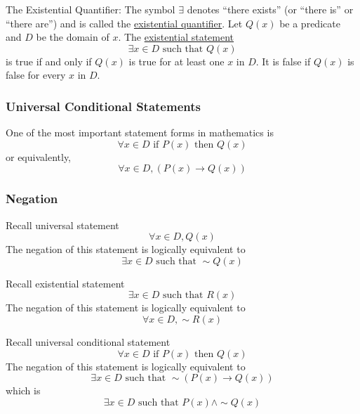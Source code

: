 \begin{definition}
    The Existential Quantifier: The symbol $\exists$ denotes ``there exists'' (or ``there is'' or ``there are'') and is called the \underline{existential quantifier}. Let $Q(x)$ be a predicate and $D$ be the domain of $x$. The \underline{existential statement} $$\exists x\in D \text{ such that } Q(x)$$ is true if and only if $Q(x)$ is true for at least one $x$ in $D$. It is false if $Q(x)$ is false for every $x$ in $D$.
\end{definition}

\subsubsection{Universal Conditional Statements}
One of the most important statement forms in mathematics is $$\forall x \in D \text{ if } P(x) \text{ then } Q(x)$$ or equivalently, $$\forall x\in D, \left(P(x)\rightarrow Q(x)\right)$$

\subsubsection{Negation}
Recall universal statement $$\forall x\in D, Q(x)$$ The negation of this statement is logically equivalent to $$\exists x\in D \text{ such that } \sim Q(x)$$

Recall existential statement $$\exists x\in D \text{ such that } R(x)$$ The negation of this statement is logically equivalent to $$\forall x\in D, \sim R(x)$$

Recall universal conditional statement $$\forall x\in D \text{ if } P(x) \text{ then } Q(x)$$ The negation of this statement is logically equivalent to $$\exists x\in D \text{ such that } \sim\left(P(x)\rightarrow Q(x)\right)$$ which is $$\exists x\in D \text{ such that } P(x)\land\sim Q(x)$$
